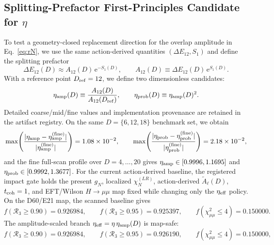 \documentclass[aps,prd,onecolumn,notitlepage,nofootinbib,superscriptaddress,11pt,floatfix]{revtex4-2}
\newcommand{\ee}{\mathrm{e}}
\begin{document}
\subsection{Splitting-Prefactor First-Principles Candidate for \texorpdfstring{$\eta$}{eta}}
\label{app:eta_candidate}
To test a geometry-closed replacement direction for the overlap amplitude in Eq.~\eqref{eq:rN}, we use the same action-derived quantities $(\Delta E_{12},S_1)$ and define the splitting prefactor
\begin{equation}
\Delta E_{12}(D)\approx A_{12}(D)\,\ee^{-S_1(D)},\qquad
A_{12}(D)\equiv \Delta E_{12}(D)\,\ee^{S_1(D)}.
\end{equation}
With a reference point $D_{\rm ref}=12$, we define two dimensionless candidates:
\begin{equation}
\eta_{\rm amp}(D)\equiv \frac{A_{12}(D)}{A_{12}(D_{\rm ref})},\qquad
\eta_{\rm prob}(D)\equiv \eta_{\rm amp}(D)^2.
\label{eq:eta_pref_candidates}
\end{equation}
Detailed coarse/mid/fine values and implementation provenance are retained in the artifact registry. On the same $D=\{6,12,18\}$ benchmark set, we obtain
\begin{equation}
\max\!\left(\frac{|\eta_{\rm amp}-\eta_{\rm amp}^{\rm(fine)}|}{|\eta_{\rm amp}^{\rm(fine)}|}\right)=1.08\times10^{-2},\qquad
\max\!\left(\frac{|\eta_{\rm prob}-\eta_{\rm prob}^{\rm(fine)}|}{|\eta_{\rm prob}^{\rm(fine)}|}\right)=2.18\times10^{-2},
\end{equation}
and the fine full-scan profile over $D=4,\dots,20$ gives $\eta_{\rm amp}\in[0.9996,1.1695]$ and $\eta_{\rm prob}\in[0.9992,1.3677]$.  For the current action-derived baseline, the registered impact gate holds the present $g_N$, localized $\chi_N^{(LR)}$, action-derived $\tilde A_\ell(D)$, $t_{\rm coh}=1$, and EFT/Wilson $H\to\mu\mu$ map fixed while changing only the $\eta_{\rm eff}$ policy.  On the D60/E21 map, the scanned baseline gives
\begin{equation}
f(\mathcal R_3\ge0.90)=0.926984,\qquad
f(\mathcal R_3\ge0.95)=0.925397,\qquad
f(\chi^2_{\mu\mu}\le4)=0.150000.
\end{equation}
The amplitude-scaled branch \(\eta_{\rm eff}=\eta\,\eta_{\rm amp}(D)\) is map-safe:
\begin{equation}
f(\mathcal R_3\ge0.90)=0.926984,\qquad
f(\mathcal R_3\ge0.95)=0.926190,\qquad
f(\chi^2_{\mu\mu}\le4)=0.150000,
\end{equation}
\end{document}

